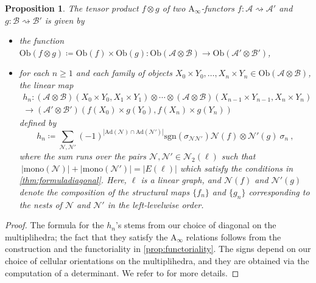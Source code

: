 \documentclass[twoside, 12pt]{amsart}
\newtheorem{proposition}[definition]{Proposition}
\theoremstyle{remark}
\newcommand{\cat}[1]{\mathcal{#1}}
\newcommand{\gra}{\ell}
\newcommand{\mono}{\ensuremath{\mathrm{mono}}}
\begin{document}
\begin{proposition}
\label{prop:tensorproduct}
The \emph{tensor product} $f\otimes g$ of two $\mathrm{A}_\infty$-functors $f:\cat{A}\rightsquigarrow \cat{A}'$ and $g:\cat{B} \rightsquigarrow \cat{B}'$ is given by 
\begin{itemize}
\item the function $\mathrm{Ob}(f\otimes g)\coloneqq \mathrm{Ob}(f)\times \mathrm{Ob}(g) : \mathrm{Ob}(\cat{A}\otimes\cat{B}) \to \mathrm{Ob}(\cat{A}'\otimes\cat{B}')$,
\item for each $n\geq 1$ and each family of objects $X_0\times Y_0,\ldots,X_n\times Y_n \in \mathrm{Ob}(\cat{A}\otimes\cat{B})$, the linear map 
\begin{eqnarray*}
h_n : (\cat{A}\otimes \cat{B})(X_0\times Y_0,X_1\times Y_1) \otimes  \cdots \otimes (\cat{A}\otimes \cat{B})(X_{n-1}\times Y_{n-1},X_n\times Y_n) \\
\to (\cat{A}'\otimes \cat{B}')(f(X_0)\times g(Y_0),f(X_n)\times g(Y_n)) 
\end{eqnarray*}
defined by 
\[h_n \coloneqq 
\sum_{
\mathcal{N},\mathcal{N}'} 
(-1)^{|\mathrm{Ad}(\mathcal{N})\cap \mathrm{Ad}(\mathcal{N}')|}
\mathrm{sgn}(\sigma_{\mathcal{N}\mathcal{N}'})
\mathcal{N}(f)\otimes \mathcal{N}'(g) \ \sigma_n \ ,\]
where the sum runs over the pairs $\mathcal{N},\mathcal{N}' \in \mathcal{N}_2(\gra)$ such that $\ |\mono(\mathcal{N})|+|\mono(\mathcal{N}')|=|E(\gra)|$ which satisfy the conditions in \cref{thm:formuladiagonal}.
Here, $\gra$ is a linear graph, and $\mathcal{N}(f)$ and $\mathcal{N}'(g)$ denote the composition of the structural maps $\{f_n\}$ and $\{g_n\}$ corresponding to the nests of $\mathcal{N}$ and $\mathcal{N}'$ in the left-levelwise order.
\end{itemize}
\end{proposition}


\begin{proof}
  The formula for the $h_n$'s stems from our choice of diagonal on the multiplihedra; the fact that they satisfy the $\mathrm{A}_\infty$ relations follows from the construction and the functoriality in \cref{prop:functoriality}. The signs depend on our choice of cellular orientations on the multiplihedra, and they are obtained via the computation of a determinant. We refer to \cite[Section 4.3]{LA21} for more details. 
\end{proof}
\end{document}
